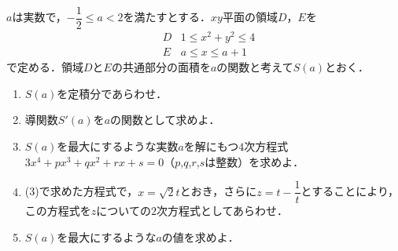 \documentclass[../../main.tex]{subfiles}
\begin{document}
$a$は実数で，$-\dfrac{1}{2}\le a<2$を満たすとする．$xy$平面の領域$D$，$E$を
\begin{align*}
  & D & 1\le x^2+y^2\le 4 \\
  & E & a\le x \le a+1
\end{align*}
で定める．領域$D$と$E$の共通部分の面積を$a$の関数と考えて$S(a)$とおく．

\begin{enumerate}
  \item $S(a)$を定積分であらわせ．
  \item 導関数$S'(a)$を$a$の関数として求めよ．
  \item $S(a)$を最大にするような実数$a$を解にもつ$4$次方程式$3x^4+px^3+qx^2+rx+s=0$（$p$,$q$,$r$,$s$は整数）を求めよ．
  \item (3)で求めた方程式で，$x=\sqrt{2}t$とおき，さらに$z=t-\dfrac{1}{t}$とすることにより，この方程式を$z$についての$2$次方程式としてあらわせ．
  \item $S(a)$を最大にするような$a$の値を求めよ．
\end{enumerate}
\end{document}
